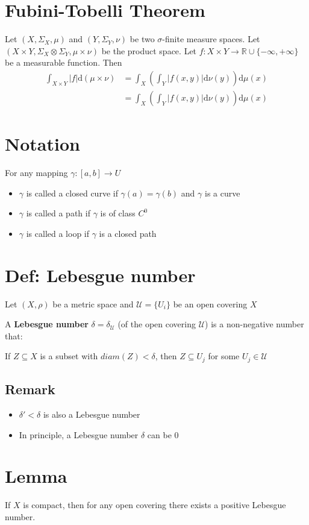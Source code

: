 \documentclass{article}
\newcommand{\abs}[1]{\left\lvert #1 \right\rvert}
\begin{document}
\section{Fubini-Tobelli Theorem}
Let $(X,\Sigma_X,\mu)$ and $(Y,\Sigma_Y,\nu)$ be two $\sigma$-finite measure spaces. Let $(X\times Y,\Sigma_X\otimes\Sigma_Y,\mu\times\nu)$ be the product space. Let $f:X\times Y\rightarrow \mathbb{R}\cup\{-\infty,+\infty\}$ be a measurable function. Then 
$$\begin{aligned}
    \int_{X\times Y}\abs{f}\text{d}(\mu\times\nu) &=\int_X(\int_Y\abs{f(x,y)}\text{d}\nu(y))\text{d}\mu(x)\\
    &=\int_X(\int_Y\abs{f(x,y)}\text{d}\nu(y))\text{d}\mu(x)
\end{aligned}$$
\section{Notation}
For any mapping $\gamma:[a,b]\rightarrow U$
\begin{itemize}
    \item $\gamma$ is called a closed curve if $\gamma(a)=\gamma(b)$ and $\gamma$ is a curve
    \item $\gamma$ is called a path if $\gamma$ is of class $C^0$
    \item $\gamma$ is called a loop if $\gamma$ is a closed path
\end{itemize}
\section{Def: Lebesgue number}
Let $(X,\rho)$ be a metric space and $\mathcal{U}=\{U_i\}$ be an open covering $X$

A \textbf{Lebesgue number} $\delta=\delta_{\mathcal{U}}$ (of the open covering $\mathcal{U}$) is a non-negative number that:

If $Z\subseteq X$ is a subset with $diam(Z)<\delta$, then $Z\subseteq U_j$ for some $U_j\in \mathcal{U}$
\subsection*{Remark}\begin{itemize}
    \item $\delta'<\delta$ is also a Lebesgue number
    \item In principle, a Lebesgue number $\delta$ can be 0
\end{itemize}
\section{Lemma} If $X$ is compact, then for any open covering there exists a positive Lebesgue number.
\end{document}

